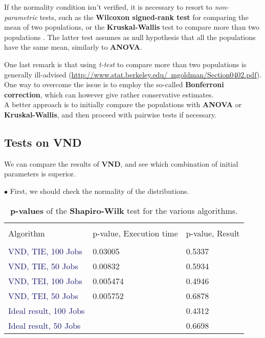 \documentclass[
12pt,
a4paper,
oneside,
headinclude,
footinclude]{article}
\theoremstyle{definition} %
\begin{document}
If the normality condition isn't verified, it is necessary to resort to \textit{non-parametric} tests, such as the \textbf{Wilcoxon signed-rank test} \cite{wilcoxon1945individual} for comparing the mean of two populations, or the \textbf{Kruskal-Wallis} test to compare more than two populations \cite{kruskal1952use}. The latter test assumes as null hypothesis that all the populations have the same mean, similarly to \textbf{ANOVA}.

One last remark is that using \textit{t-test} to compare more than two populations is generally ill-advised (\href{http://www.stat.berkeley.edu/~mgoldman/Section0402.pdf}{http://www.stat.berkeley.edu/~mgoldman/Section0402.pdf}). One way to overcome the issue is to employ the so-called \textbf{Bonferroni correction}, which can however give rather conservative estimates. \\   
A better approach is to initially compare the populations with \textbf{ANOVA} or \textbf{Kruskal-Wallis}, and then proceed with pairwise tests if necessary.

\subsection{Tests on VND}

We can compare the results of \textbf{VND}, and see which combination of initial parameters is superior.

$\bullet$ First, we should check the normality of the distributions.

\begin{table}[H]
    \centering %
    \begin{tabular}{l l l} %
        \hline
        \hline 
        \\[-1.5ex]
        \textcolor{BrickRed}{Algorithm} & \textcolor{BrickRed}{p-value, Execution time} & \textcolor{BrickRed}{p-value, Result} \\ [0.5ex]
        \hline %
        \\[-1.5ex]
        \textcolor{MidnightBlue}{VND, TIE, 100 Jobs}  & 0.03005 & 0.5337    \\
        \textcolor{MidnightBlue}{VND, TIE, 50 Jobs}   & 0.00832  & 0.5934   \\
        \textcolor{MidnightBlue}{VND, TEI, 100 Jobs}  & 0.005474  & 0.4946    \\
        \textcolor{MidnightBlue}{VND, TEI, 50 Jobs}   & 0.005752  &  0.6878  \\
        \textcolor{MidnightBlue}{Ideal result, 100 Jobs}   & & 0.4312\\       
        \textcolor{MidnightBlue}{Ideal result, 50 Jobs}        & & 0.6698    
        \\[1ex] %
        \hline %
    \end{tabular}
    \caption{\label{tab:shapiro}\textbf{p-values} of the \textbf{Shapiro-Wilk} test for the various algorithms.}
\end{table} 
\end{document}

